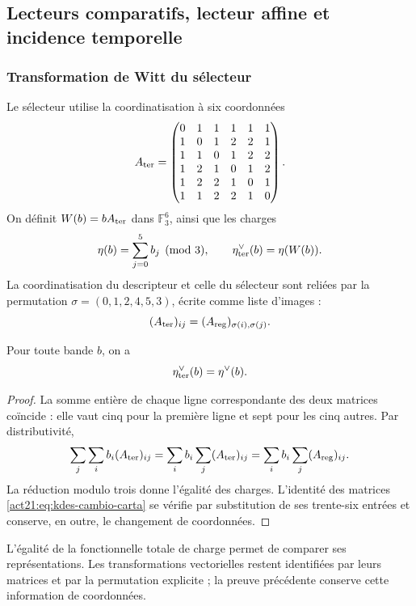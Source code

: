 \subsection{Lecteurs comparatifs, lecteur affine et incidence temporelle}

\subsubsection{Transformation de Witt du sélecteur}

Le sélecteur utilise la coordinatisation à six coordonnées
\[
 A_{\rm ter}=
 \begin{pmatrix}
 0&1&1&1&1&1\\
 1&0&1&2&2&1\\
 1&1&0&1&2&2\\
 1&2&1&0&1&2\\
 1&2&2&1&0&1\\
 1&1&2&2&1&0
 \end{pmatrix}.
\]
On définit $W(b)=bA_{\rm ter}$ dans $\mathbb F_3^6$, ainsi que les charges
\[
 \eta(b)=\sum_{j=0}^5 b_j\pmod3,
 \qquad\eta_{\rm ter}^\vee(b)=\eta(W(b)).
\]
La coordinatisation du descripteur et celle du sélecteur sont reliées par la
permutation $\sigma=(0,1,2,4,5,3)$, écrite comme liste d'images :
\begin{equation}
 (A_{\rm ter})_{ij}=(A_{\rm reg})_{\sigma(i),\sigma(j)}.
 \label{act21:eq:kdes-cambio-carta}
\end{equation}

\begin{lemma}
Pour toute bande $b$, on a
\[
 \eta_{\rm ter}^\vee(b)=\eta^\vee(b).
\]
\end{lemma}
\begin{proof}
La somme entière de chaque ligne correspondante des deux matrices coïncide :
elle vaut cinq pour la première ligne et sept pour les cinq autres. Par
distributivité,
\[
 \sum_j\sum_i b_i(A_{\rm ter})_{ij}
 =\sum_i b_i\sum_j(A_{\rm ter})_{ij}
 =\sum_i b_i\sum_j(A_{\rm reg})_{ij}.
\]
La réduction modulo trois donne l'égalité des charges. L'identité des matrices \eqref{act21:eq:kdes-cambio-carta} se vérifie par substitution de ses trente-six entrées et conserve, en outre, le changement de coordonnées.
\end{proof}

L'égalité de la fonctionnelle totale de charge permet de comparer ses
représentations. Les transformations vectorielles restent identifiées
par leurs matrices et par la permutation explicite ; la preuve précédente
conserve cette information de coordonnées.

